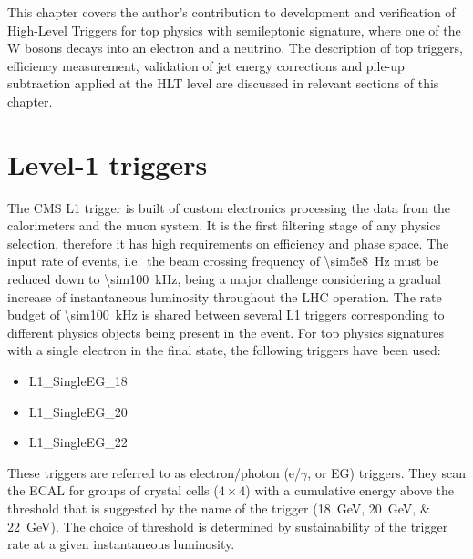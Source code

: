 This chapter covers the author's contribution to development and verification of High-Level Triggers for top physics
with semileptonic signature, where one of the W bosons decays into an electron and a neutrino. The description of top
triggers, efficiency measurement, validation of jet energy corrections and pile-up subtraction applied at the HLT level
are discussed in relevant sections of this chapter.

\section{Level-1 triggers}
The CMS L1 trigger \autocite{CMS_L1_Trigger_TDR} is built of custom electronics processing the data from the
calorimeters and the muon system. It is the first filtering stage of any physics selection, therefore it has high
requirements on efficiency and phase space. The input rate of events, i.e.\ the beam crossing frequency of
\SI{\sim5e8}{\hertz} must be reduced down to \SI{\sim100}{\kilo\hertz}, being a major challenge considering a gradual
increase of instantaneous luminosity throughout the LHC operation. The rate budget of \SI{\sim100}{\kilo\hertz} is
shared between several L1 triggers corresponding to different physics objects being present in the event. For top
physics signatures with a single electron in the final state, the following triggers have been used:

\begin{itemize}
 \item L1\_SingleEG\_18
 \item L1\_SingleEG\_20
 \item L1\_SingleEG\_22
\end{itemize}

These triggers are referred to as electron/photon (e/$\gamma$, or EG) triggers. They scan the ECAL for groups of crystal
cells ($4 \times 4$) with a cumulative energy above the threshold that is suggested by the name of the trigger
(\SIlist{18;20;22}{\GeV}). The choice of threshold is determined by sustainability of the trigger rate at a given
instantaneous luminosity.


